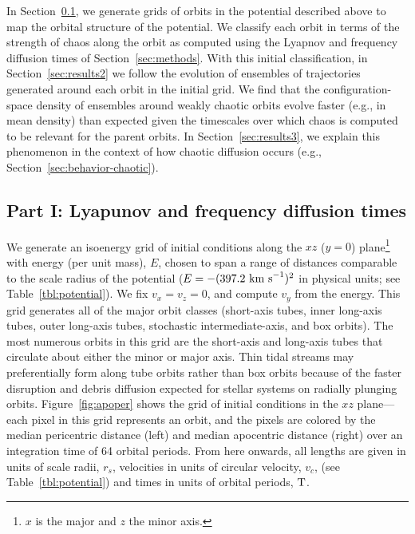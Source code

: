 \documentclass[letterpaper,12pt,preprint]{aastex}
\newcommand{\periods}{\ensuremath{{\rm T}}}
\newcommand{\chchchanges}[1]{{\color{red} {#1}}}
\begin{document}
In Section~\ref{sec:results1}, we generate grids of orbits in the potential described above to map the orbital structure of the potential. We classify each orbit in terms of the strength of chaos along the orbit as computed using the Lyapnov and frequency diffusion times of Section~\ref{sec:methods}. With this initial classification, in Section~\ref{sec:results2} we follow the evolution of ensembles of \chchchanges{trajectories} generated around each orbit in the initial grid. We find that the configuration-space density of ensembles around weakly chaotic orbits evolve faster (e.g., in mean density) than expected given the timescales over which chaos is computed to be relevant for the parent orbits. In Section~\ref{sec:results3}, we explain this phenomenon in the context of how chaotic diffusion occurs (e.g., Section~\ref{sec:behavior-chaotic}).

\subsection{Part I: Lyapunov and frequency diffusion times}\label{sec:results1}

We generate an isoenergy grid of initial conditions along the $xz$ ($y=0$) plane\footnote{$x$ is the major and $z$ the minor axis.} with energy (per unit mass), $E$, chosen to span a range of distances comparable to the scale radius of the potential ($E=-(397.2~{\rm km~s}^{-1})^2$ in physical units; see Table~\ref{tbl:potential}). We fix $v_x = v_z = 0$, and compute $v_y$ from the energy. This grid generates all of the major orbit classes (short-axis tubes, inner long-axis tubes, outer long-axis tubes, stochastic intermediate-axis, and box orbits). \chchchanges{The most numerous orbits in this grid are the short-axis and long-axis tubes that circulate about either the minor or major axis. Thin tidal streams may preferentially form along tube orbits rather than box orbits because of the faster disruption and debris diffusion expected for stellar systems on radially plunging orbits. Figure~\ref{fig:apoper} shows the grid of initial conditions in the $xz$ plane---each pixel in this grid represents an orbit, and the pixels are colored by the median pericentric distance (left) and median apocentric distance (right) over an integration time of 64 orbital periods. From here onwards, all lengths are given in units of scale radii, $r_s$, velocities in units of circular velocity, $v_c$, (see Table~\ref{tbl:potential}) and times in units of orbital periods, $\periods$.}
\end{document}
